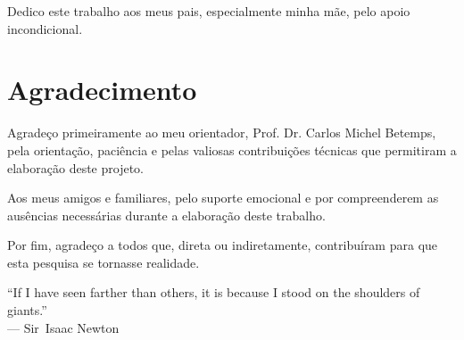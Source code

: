 %
%

\begin{dedicatoria}
Dedico este trabalho aos meus pais, especialmente minha mãe, pelo apoio incondicional.
\end{dedicatoria}

%
%

\chapter*{Agradecimento}
Agradeço primeiramente ao meu orientador, Prof. Dr. Carlos Michel Betemps, pela orientação, paciência e pelas valiosas contribuições técnicas que permitiram a elaboração deste projeto.

Aos meus amigos e familiares, pelo suporte emocional e por compreenderem as ausências necessárias durante a elaboração deste trabalho.

Por fim, agradeço a todos que, direta ou indiretamente, contribuíram para que esta pesquisa se tornasse realidade.

%
%
\begin{epigrafe}
``If I have seen farther than others, it is because I stood on the shoulders of giants.''\\
--- Sir~Isaac Newton
\end{epigrafe}
